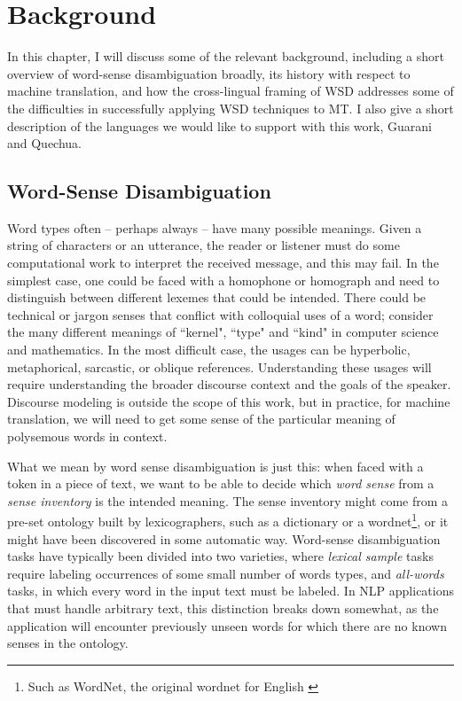 \chapter{Background}
\label{chap:background}

In this chapter, I will discuss some of the relevant background, including a
short overview of word-sense disambiguation broadly, its history with respect
to machine translation, and how the cross-lingual framing of WSD addresses some
of the difficulties in successfully applying WSD techniques to MT. I also give
a short description of the languages we would like to support with this work,
Guarani and Quechua.

\section{Word-Sense Disambiguation}
Word types often -- perhaps always -- have many possible meanings. Given a
string of characters or an utterance, the reader or listener must do some
computational work to interpret the received message, and this may fail.
In the simplest case, one could be faced with
a homophone or homograph and need to distinguish between different lexemes that
could be intended. There could be technical or jargon senses that conflict with
colloquial uses of a word; consider the many different meanings of ``kernel",
``type" and ``kind" in computer science and mathematics. In the most difficult
case, the usages can be hyperbolic, metaphorical, sarcastic, or oblique
references. Understanding these usages will require understanding the broader
discourse context and the goals of the speaker. Discourse modeling is outside
the scope of this work, but in practice, for machine translation, we will need
to get some sense of the particular meaning of polysemous words in context.

What we mean by word sense disambiguation is just this:
when faced with a token in a piece of text, we want to be able to
decide which \emph{word sense} from a \emph{sense inventory} is the intended
meaning. The sense inventory might come from a pre-set ontology built by
lexicographers, such as a
dictionary or a wordnet\footnote{Such as WordNet\textregistered, 
the original wordnet for English \cite{DBLP:journals/cacm/Miller95}}, or it
might have been discovered in some automatic
way. Word-sense disambiguation tasks have typically been divided into two
varieties, where \emph{lexical sample} tasks require labeling occurrences of
some small number of words types, and \emph{all-words} tasks, in which every
word in the input text must be labeled. In NLP applications that must handle
arbitrary text, this distinction breaks down somewhat, as the application will
encounter previously unseen words for which there are no known senses in the
ontology.

